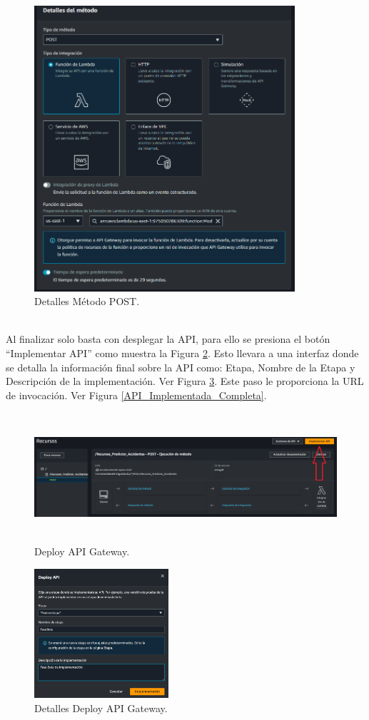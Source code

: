 \documentclass[a4paper,10pt, oneside, titlepage]{article}
\begin{document}
	\begin{figure}[!h]
		\centering
		\includegraphics[width = 1\linewidth, height = 10.6cm]{Detalles_Metodo_POST.png}
		\caption{Detalles Método POST.}
		\label{Detalles_Metodo_POST}
	\end{figure} \\
	\indent Al finalizar solo basta con desplegar la API, para ello se presiona el botón ``Implementar API'' como muestra la Figura \ref{Deploy_API_Gateway}. Esto llevara a una interfaz donde se detalla la información final sobre la API como: Etapa, Nombre de la Etapa y Descripción de la implementación. Ver Figura \ref{Detalles_Deploy_API}. Este paso le proporciona la URL de invocación. Ver Figura \ref{API_Implementada_Completa}.
	\begin{figure}[!h]
		\centering
		\includegraphics[width = 1\linewidth, height = 4.8cm]{Deploy_API_Gateway.png}
		\caption{Deploy API Gateway.}
		\label{Deploy_API_Gateway}
	\end{figure}
	\begin{figure}[!h]
		\centering
		\includegraphics[width = 1\linewidth, height = 4.8cm]{Detalles_Deploy_API.png}
		\caption{Detalles Deploy API Gateway.}
		\label{Detalles_Deploy_API}
	\end{figure}
\end{document}
